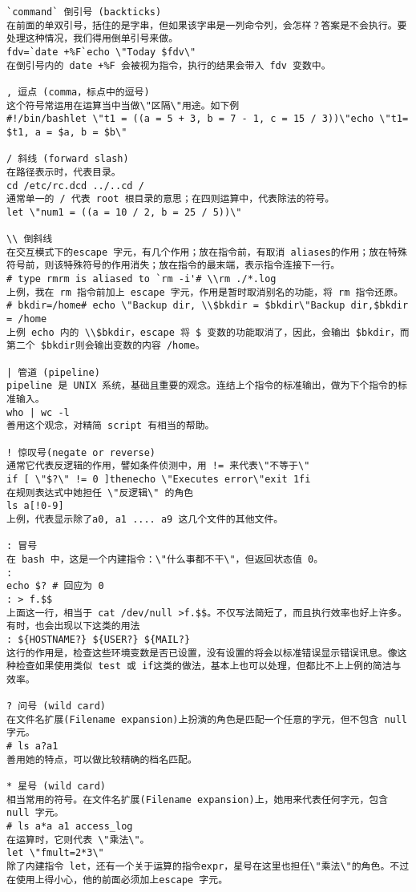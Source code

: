 \begin{lstlisting}
`command` 倒引号 (backticks)
在前面的单双引号，括住的是字串，但如果该字串是一列命令列，会怎样？答案是不会执行。要处理这种情况，我们得用倒单引号来做。
fdv=`date +%F`echo \"Today $fdv\"
在倒引号内的 date +%F 会被视为指令，执行的结果会带入 fdv 变数中。

, 逗点 (comma，标点中的逗号)
这个符号常运用在运算当中当做\"区隔\"用途。如下例
#!/bin/bashlet \"t1 = ((a = 5 + 3, b = 7 - 1, c = 15 / 3))\"echo \"t1= $t1, a = $a, b = $b\"

/ 斜线 (forward slash)
在路径表示时，代表目录。
cd /etc/rc.dcd ../..cd /
通常单一的 / 代表 root 根目录的意思；在四则运算中，代表除法的符号。
let \"num1 = ((a = 10 / 2, b = 25 / 5))\"

\\ 倒斜线
在交互模式下的escape 字元，有几个作用；放在指令前，有取消 aliases的作用；放在特殊符号前，则该特殊符号的作用消失；放在指令的最末端，表示指令连接下一行。
# type rmrm is aliased to `rm -i'# \\rm ./*.log
上例，我在 rm 指令前加上 escape 字元，作用是暂时取消别名的功能，将 rm 指令还原。
# bkdir=/home# echo \"Backup dir, \\$bkdir = $bkdir\"Backup dir,$bkdir = /home
上例 echo 内的 \\$bkdir，escape 将 $ 变数的功能取消了，因此，会输出 $bkdir，而第二个 $bkdir则会输出变数的内容 /home。

| 管道 (pipeline)
pipeline 是 UNIX 系统，基础且重要的观念。连结上个指令的标准输出，做为下个指令的标准输入。
who | wc -l
善用这个观念，对精简 script 有相当的帮助。

! 惊叹号(negate or reverse)
通常它代表反逻辑的作用，譬如条件侦测中，用 != 来代表\"不等于\"
if [ \"$?\" != 0 ]thenecho \"Executes error\"exit 1fi
在规则表达式中她担任 \"反逻辑\" 的角色
ls a[!0-9]
上例，代表显示除了a0, a1 .... a9 这几个文件的其他文件。

: 冒号
在 bash 中，这是一个内建指令：\"什么事都不干\"，但返回状态值 0。
:
echo $? # 回应为 0
: > f.$$
上面这一行，相当于 cat /dev/null >f.$$。不仅写法简短了，而且执行效率也好上许多。
有时，也会出现以下这类的用法
: ${HOSTNAME?} ${USER?} ${MAIL?}
这行的作用是，检查这些环境变数是否已设置，没有设置的将会以标准错误显示错误讯息。像这种检查如果使用类似 test 或 if这类的做法，基本上也可以处理，但都比不上上例的简洁与效率。

? 问号 (wild card)
在文件名扩展(Filename expansion)上扮演的角色是匹配一个任意的字元，但不包含 null 字元。
# ls a?a1
善用她的特点，可以做比较精确的档名匹配。

* 星号 (wild card)
相当常用的符号。在文件名扩展(Filename expansion)上，她用来代表任何字元，包含 null 字元。
# ls a*a a1 access_log
在运算时，它则代表 \"乘法\"。
let \"fmult=2*3\"
除了内建指令 let，还有一个关于运算的指令expr，星号在这里也担任\"乘法\"的角色。不过在使用上得小心，他的前面必须加上escape 字元。


\end{lstlisting}
